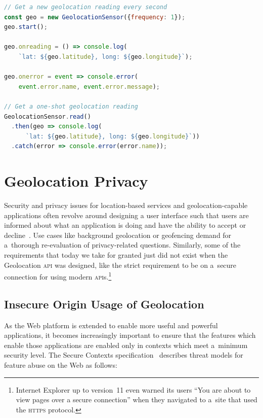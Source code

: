 \documentclass[sigconf,hyphens]{acmart}
\begin{document}
\begin{lstlisting}[caption={Geolocation Sensor \textsc{api}},
  label=code:geolocationsensor, language=JavaScript, float=t] 
// Get a new geolocation reading every second
const geo = new GeolocationSensor({frequency: 1});
geo.start();

geo.onreading = () => console.log(
    `lat: ${geo.latitude}, long: ${geo.longitude}`);

geo.onerror = event => console.error(
    event.error.name, event.error.message);

// Get a one-shot geolocation reading
GeolocationSensor.read()
  .then(geo => console.log(
      `lat: ${geo.latitude}, long: ${geo.longitude}`))
  .catch(error => console.error(error.name));
\end{lstlisting}

\section{Geolocation Privacy}

Security and privacy issues for location-based services and geolocation-capable applications
often revolve around designing a user interface such that users are informed
about what an application is doing and have the ability to accept or decline~\cite{doty2010gpa}.
Use cases like background geolocation or geofencing
demand for a~thorough re-evaluation of privacy-related questions.
Similarly, some of the requirements that today we take for granted
just did not exist when the Geolocation \textsc{api} was designed,
like the strict requirement to be on a~secure connection for using modern
\textsc{api}s.\footnote{Internet Explorer up to version~11 even warned its users
``You are about to view pages over a secure connection''
when they navigated to a~site that used the \textsc{https} protocol.}

\subsection{Insecure Origin Usage of Geolocation}

As the Web platform is extended to enable more useful and powerful applications,
it becomes increasingly important to ensure that the features
which enable those applications are enabled only in contexts
which meet a~minimum security level.
The Secure Contexts specification~\cite{west2016securecontexts}
describes threat models for feature abuse on the Web as follows:
\end{document}
